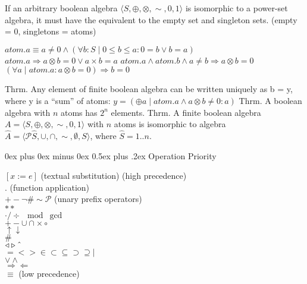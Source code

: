 \documentclass[letterpaper, 8pt]{extarticle}
\makeatletter
\renewcommand{\section}{\@startsection{section}{1}{0mm}%
                                {0ex plus 0ex minus 0ex}%
                                {0.5ex plus .2ex}%
                                {\normalfont\normalsize\bfseries}}
\newcommand{\To}{\Rightarrow}
\makeatother
\begin{document}
\begin{multicols*}{3}
    If an arbitrary boolean algebra $\langle S, \oplus, \otimes, \sim, 0, 1\rangle$ is
    isomorphic to a power-set algebra, it must have the equivalent to the empty set and singleton sets.
    (empty = 0, singletons = atoms)

    $atom.a \equiv a \neq 0 \land (\forall b : S \mid 0 \leq b \leq a : 0 = b \lor b = a)$
    $atom.a \To a \otimes b = 0 \lor a \times b = a$
    $atom.a \land atom.b \land a \neq b \To a \otimes b = 0$
    $(\forall a \mid atom.a : a \otimes b = 0) \To b = 0$

    Thrm. Any element of finite boolean algebra can be written uniquely as
    b = y, where y is a ``sum'' of atoms:
    $y = (\oplus a \mid atom.a \land a \otimes b \neq 0 : a)$
    Thrm. A boolean algebra with $n$ atoms has $2^n$ elements.
    Thrm. A finite boolean algebra $A = \langle S, \oplus, \otimes, \sim, 0, 1 \rangle$
    with $n$ atoms is isomorphic to algebra $\hat{A} = \langle \mathcal{P} \hat{S}, \cup, \cap, \sim, \emptyset, S \rangle$, where
    $\hat{S} = 1..n$.




    \section{Operation Priority}
    \begin{multicols}{3}
        $[x := e]$ (textual substitution) (high precedence) \\
        $.$ (function application) \\
        $+ - \neg \# \sim \mathcal{P}$ (unary prefix operators) \\
        $**$ \\
        $\cdot / \div \mod \gcd$ \\
        $+ - \cup \cap \times \circ$ \\
        $\uparrow \downarrow$ \\
        $\#$ \\
        $\triangleleft \triangleright \string^$ \\
        $= < > \in \subset \subseteq \supset \supseteq \mid$ \\
        $\lor \land$ \\
        $\Rightarrow \Leftarrow$ \\
        $\equiv$ (low precedence)
    \end{multicols}


\end{multicols*}
\end{document}
